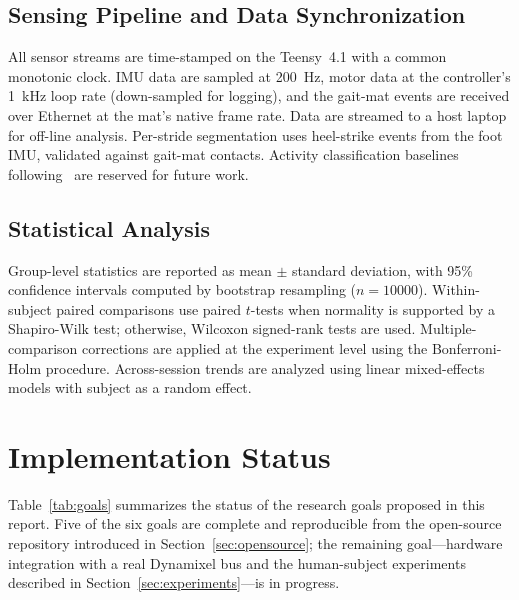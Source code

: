 \documentclass[conference]{IEEEtran}
\begin{document}
\subsection{Sensing Pipeline and Data Synchronization}

All sensor streams are time-stamped on the Teensy~4.1 with a common monotonic clock. IMU data are sampled at 200~Hz, motor data at the controller's 1~kHz loop rate (down-sampled for logging), and the gait-mat events are received over Ethernet at the mat's native frame rate. Data are streamed to a host laptop for off-line analysis. Per-stride segmentation uses heel-strike events from the foot IMU, validated against gait-mat contacts. Activity classification baselines following~\cite{paydarfar2020rnn} are reserved for future work.

\subsection{Statistical Analysis}

Group-level statistics are reported as mean $\pm$ standard deviation, with 95\% confidence intervals computed by bootstrap resampling ($n=10000$). Within-subject paired comparisons use paired $t$-tests when normality is supported by a Shapiro-Wilk test; otherwise, Wilcoxon signed-rank tests are used. Multiple-comparison corrections are applied at the experiment level using the Bonferroni-Holm procedure. Across-session trends are analyzed using linear mixed-effects models with subject as a random effect.

\section{Implementation Status}
\label{sec:results}

Table~\ref{tab:goals} summarizes the status of the research goals proposed in this report. Five of the six goals are complete and reproducible from the open-source repository introduced in Section~\ref{sec:opensource}; the remaining goal---hardware integration with a real Dynamixel bus and the human-subject experiments described in Section~\ref{sec:experiments}---is in progress.
\end{document}
